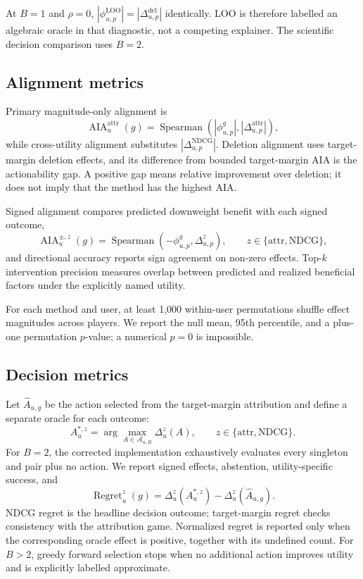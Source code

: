 \documentclass[11pt]{article}
\newcommand{\AIA}{\operatorname{AIA}}
\begin{document}
At $B=1$ and $\rho=0$, $|\phi^{\mathrm{LOO}}_{u,p}|=|\Delta^{\mathrm{del}}_{u,p}|$ identically. LOO is therefore labelled an algebraic oracle in that diagnostic, not a competing explainer. The scientific decision comparison uses $B=2$.

\subsection{Alignment metrics}
Primary magnitude-only alignment is
\begin{equation}
\AIA_u^{\mathrm{attr}}(g)=\operatorname{Spearman}\left(|\phi^g_{u,p}|,|\Delta^{\mathrm{attr}}_{u,p}|\right),
\end{equation}
while cross-utility alignment substitutes $|\Delta^{\mathrm{NDCG}}_{u,p}|$. Deletion alignment uses target-margin deletion effects, and its difference from bounded target-margin AIA is the actionability gap. A positive gap means relative improvement over deletion; it does not imply that the method has the highest AIA.

Signed alignment compares predicted downweight benefit with each signed outcome,
\begin{equation}
\AIA_u^{\pm,z}(g)=\operatorname{Spearman}(-\phi^g_{u,p},\Delta^z_{u,p}),
\qquad z\in\{\mathrm{attr},\mathrm{NDCG}\},
\end{equation}
and directional accuracy reports sign agreement on non-zero effects. Top-$k$ intervention precision measures overlap between predicted and realized beneficial factors under the explicitly named utility.

For each method and user, at least 1,000 within-user permutations shuffle effect magnitudes across players. We report the null mean, 95th percentile, and a plus-one permutation $p$-value; a numerical $p=0$ is impossible.

\subsection{Decision metrics}
Let $\widehat A_{u,g}$ be the action selected from the target-margin attribution and define a separate oracle for each outcome:
\begin{equation}
A_u^{*,z}=\arg\max_{A\in\mathcal A_{u,B}}\Delta_u^z(A),
\qquad z\in\{\mathrm{attr},\mathrm{NDCG}\}.
\end{equation}
For $B=2$, the corrected implementation exhaustively evaluates every singleton and pair plus no action. We report signed effects, abstention, utility-specific success, and
\begin{equation}
\operatorname{Regret}_u^z(g)=\Delta_u^z(A_u^{*,z})-\Delta_u^z(\widehat A_{u,g}).
\end{equation}
NDCG regret is the headline decision outcome; target-margin regret checks consistency with the attribution game. Normalized regret is reported only when the corresponding oracle effect is positive, together with its undefined count. For $B>2$, greedy forward selection stops when no additional action improves utility and is explicitly labelled approximate.
\end{document}
